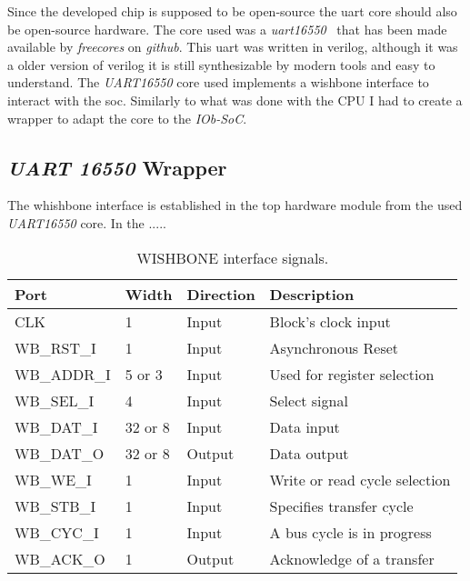 Since the developed chip is supposed to be open-source the \acrshort{uart} core should also be open-source hardware. The core used was a \textit{\acrshort{uart}16550}~\cite{gorban2002uart} that has been made available by \textit{freecores} on \textit{github}. This \acrshort{uart} was written in verilog, although it was a older version of verilog it is still synthesizable by modern tools and easy to understand. The \textit{UART16550} core used implements a wishbone interface to interact with the \acrfull{soc}. Similarly to what was done with the CPU I had to create a wrapper to adapt the core to the \textit{IOb-SoC}.

\subsection{\textit{UART 16550} Wrapper}
The whishbone interface is established in the top hardware module from the used \textit{UART16550} core. In the .....

\begin{table}[!ht]
  \centering
  \begin{tabular}{|l|l|l|l|}
  \hline
  \textbf{Port} & \textbf{Width} & \textbf{Direction} & \textbf{Description}          \\ \hline
  CLK           & 1              & Input              & Block's clock input           \\ \hline
  WB\_RST\_I    & 1              & Input              & Asynchronous Reset            \\ \hline
  WB\_ADDR\_I   & 5 or 3         & Input              & Used for register selection   \\ \hline
  WB\_SEL\_I    & 4              & Input              & Select signal                 \\ \hline
  WB\_DAT\_I    & 32 or 8        & Input              & Data input                    \\ \hline
  WB\_DAT\_O    & 32 or 8        & Output             & Data output                   \\ \hline
  WB\_WE\_I     & 1              & Input              & Write or read cycle selection \\ \hline
  WB\_STB\_I    & 1              & Input              & Specifies transfer cycle      \\ \hline
  WB\_CYC\_I    & 1              & Input              & A bus cycle is in progress    \\ \hline
  WB\_ACK\_O    & 1              & Output             & Acknowledge of a transfer     \\ \hline
  \end{tabular}
  \caption{WISHBONE interface signals.}
  \label{tab:uart16550_wishbone}
\end{table}

